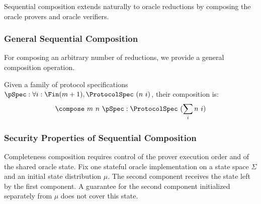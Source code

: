 \begin{definition}
    \label{def:oracle_reduction_append}
    Sequential composition extends naturally to oracle reductions by composing the oracle provers and oracle verifiers.
    \leanok
\end{definition}

\subsubsection{General Sequential Composition}

For composing an arbitrary number of reductions, we provide a general composition operation.

\begin{definition}
    \label{def:protocol_spec_compose}
    Given a family of protocol specifications $\pSpec : \forall i : \Fin(m+1), \ProtocolSpec\ (n\ i)$, their composition is:
    \[ \compose\ m\ n\ \pSpec : \ProtocolSpec\ (\sum_{i} n\ i) \]
    \leanok
\end{definition}

\begin{definition}
    \label{def:prover_compose}
    \leanok
\end{definition}

\begin{definition}
    \label{def:verifier_compose}
    \leanok
\end{definition}

\begin{definition}
    \label{def:reduction_compose}
    \leanok
\end{definition}

\subsubsection{Security Properties of Sequential Composition}

Completeness composition requires control of the prover execution order and of the shared
oracle state. Fix one stateful oracle implementation on a state space $\Sigma$ and an initial
state distribution $\mu$. The second component receives the state left by the first component.
A guarantee for the second component initialized separately from $\mu$ does not cover this state.

